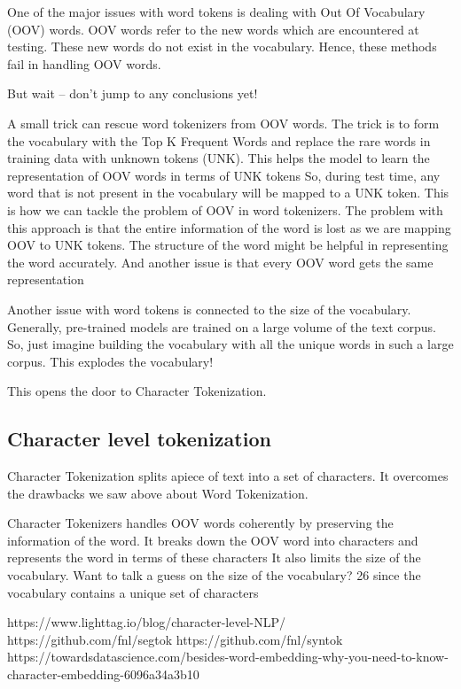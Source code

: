 One of the major issues with word tokens is dealing with Out Of Vocabulary (OOV) words. OOV words refer to the new words which are encountered at testing. These new words do not exist in the vocabulary. Hence, these methods fail in handling OOV words.

But wait – don’t jump to any conclusions yet!

    A small trick can rescue word tokenizers from OOV words. The trick is to form the vocabulary with the Top K Frequent Words and replace the rare words in training data with unknown tokens (UNK). This helps the model to learn the representation of OOV words in terms of UNK tokens
    So, during test time, any word that is not present in the vocabulary will be mapped to a UNK token. This is how we can tackle the problem of OOV in word tokenizers.
    The problem with this approach is that the entire information of the word is lost as we are mapping OOV to UNK tokens. The structure of the word might be helpful in representing the word accurately. And another issue is that every OOV word gets the same representation

Another issue with word tokens is connected to the size of the vocabulary. Generally, pre-trained models are trained on a large volume of the text corpus. So, just imagine building the vocabulary with all the unique words in such a large corpus. This explodes the vocabulary!

This opens the door to Character Tokenization.
    
\subsection{Character level tokenization}

Character Tokenization splits apiece of text into a set of characters. It overcomes the drawbacks we saw above about Word Tokenization.

    Character Tokenizers handles OOV words coherently by preserving the information of the word. It breaks down the OOV word into characters and represents the word in terms of these characters
    It also limits the size of the vocabulary. Want to talk a guess on the size of the vocabulary? 26 since the vocabulary contains a unique set of characters

https://www.lighttag.io/blog/character-level-NLP/
https://github.com/fnl/segtok
https://github.com/fnl/syntok
https://towardsdatascience.com/besides-word-embedding-why-you-need-to-know-character-embedding-6096a34a3b10

